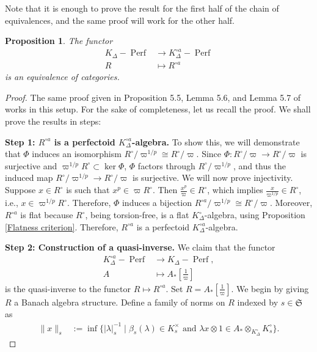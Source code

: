 \documentclass[12pts,a4paper]{amsart}
\newtheorem{proposition}{Proposition}[section]
\DeclareMathOperator{\Perf}{Perf}
\begin{document}
Note that it is enough to prove the result for the first half of the chain of equivalences, and the same proof will work for the other half.

\begin{proposition}\label{Propostion 6.3}
    The functor 
    \begin{align*}
        K_\Delta-\Perf&\to K^{\circ a}_\Delta-\Perf\\
                     R&\mapsto R^{\circ a}
    \end{align*}
    is an equivalence of categories.
\end{proposition}

\begin{proof}
  The same proof given in Proposition 5.5, Lemma 5.6, and Lemma 5.7 of \cite{Sch} works in this setup. For the sake of completeness, let us recall the proof. We shall prove the results in steps:

\textbf{Step 1: $R^{\circ a}$ is a perfectoid $K^{\circ a}_\Delta$-algebra.} To show this, we will demonstrate that $\Phi$ induces an isomorphism $R^\circ/\varpi^{1/p}\cong R^\circ/\varpi$. Since $\Phi: R^\circ/\varpi\to R^\circ/\varpi$ is surjective and $\varpi^{1/p} R^\circ\subset \ker\Phi$, $\Phi$ factors through $R^\circ/\varpi^{1/p}$, and thus the induced map $R^\circ/\varpi^{1/p}\to R^\circ/\varpi$ is surjective. We will now prove injectivity. Suppose $x\in R^\circ$ is such that $x^p\in\varpi R^\circ$. Then $\frac{x^p}{\varpi}\in R^\circ$, which implies $\frac{x}{\varpi^{1/p}}\in R^\circ$, i.e., $x\in\varpi^{1/p}R^\circ$. Therefore, $\Phi$ induces a bijection $R^{\circ a}/\varpi^{1/p}\cong R^\circ/\varpi$. Moreover, $R^{\circ a}$ is flat because $R^\circ$, being torsion-free, is a flat $K^\circ_\Delta$-algebra, using Proposition \ref{Flatness criterion}. Therefore, $R^{\circ a}$ is a perfectoid $K^{\circ a}_\Delta$-algebra.

\textbf{Step 2: Construction of a quasi-inverse.} We claim that the functor
\begin{align*}
K^{\circ a}_\Delta-\Perf&\to K_\Delta-\Perf,\\
A&\mapsto A_*\left[\frac{1}{\varpi}\right]
\end{align*}
is the quasi-inverse to the functor $R\mapsto R^{\circ a}$. Set $R=A_*\left[\frac{1}{\varpi}\right]$. We begin by giving $R$ a Banach algebra structure. Define a family of norms on $R$ indexed by $s\in \mathfrak{S}$ as
\begin{align*}
\|x\|_s&:=\inf\{|\lambda|^{-1}_s\mid \beta_s(\lambda)\in K^\times_s\text{ and } \lambda x\otimes 1\in A_*\otimes_{K^\circ_\Delta}K^\circ_s\}.
\end{align*}


\end{proof}
\end{document}
